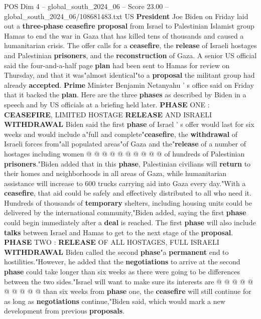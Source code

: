 \begin{textsample}{POS Dim 4 – global\_south\_2024\_06 – Score 23.00 – global\_south\_2024\_06/108681483.txt}  \label{ex:f4_pos_089}
US \textbf{President} Joe Biden on Friday laid out a \textbf{three-phase} \textbf{ceasefire} \textbf{proposal} from Israel to Palestinian Islamist group Hamas to end the war in Gaza that has killed tens of thousands and caused a humanitarian crisis.
The offer calls for a \textbf{ceasefire}, the \textbf{release} of Israeli hostages and Palestinian \textbf{prisoners}, and the \textbf{reconstruction} of Gaza.
A senior US official said the four-and-a-half page \textbf{plan} had been sent to Hamas for review on Thursday, and that it was"almost identical"to a \textbf{proposal} the militant group had already \textbf{accepted}. \textbf{Prime} Minister Benjamin Netanyahu ' s office said on Friday that it backed the \textbf{plan}.
Here are the three \textbf{phases} as described by Biden in a speech and by US officials at a briefing held later. \textbf{PHASE} ONE : \textbf{CEASEFIRE}, LIMITED HOSTAGE \textbf{RELEASE} AND ISRAELI \textbf{WITHDRAWAL} Biden said the first \textbf{phase} of Israel ' s offer would last for six weeks and would include a"full and complete"\textbf{ceasefire}, the \textbf{withdrawal} of Israeli forces from"all populated areas"of Gaza and the"\textbf{release} of a number of hostages including women @ @ @ @ @ @ @ @ @ @ of hundreds of Palestinian \textbf{prisoners}."Biden added that in this \textbf{phase}, Palestinian civilians will \textbf{return} to their homes and neighborhoods in all areas of Gaza, while humanitarian assistance will increase to 600 trucks carrying aid into Gaza every day."With a \textbf{ceasefire}, that aid could be safely and effectively distributed to all who need it.
Hundreds of thousands of \textbf{temporary} shelters, including housing units could be delivered by the international community,"Biden added, saying the first \textbf{phase} could begin immediately after a \textbf{deal} is reached.
The first \textbf{phase} will also include \textbf{talks} between Israel and Hamas to get to the next stage of the \textbf{proposal}. \textbf{PHASE} TWO : \textbf{RELEASE} OF ALL HOSTAGES, FULL ISRAELI \textbf{WITHDRAWAL} Biden called the second \textbf{phase}"a \textbf{permanent} end to hostilities."However, he added that the \textbf{negotiations} to arrive at the second \textbf{phase} could take longer than six weeks as there were going to be differences between the two sides."Israel will want to make sure its interests are @ @ @ @ @ @ @ @ @ @ than six weeks from \textbf{phase} one, the \textbf{ceasefire} will still continue for as long as \textbf{negotiations} continue,"Biden said, which would mark a new development from previous \textbf{proposals}.

\end{textsample}
